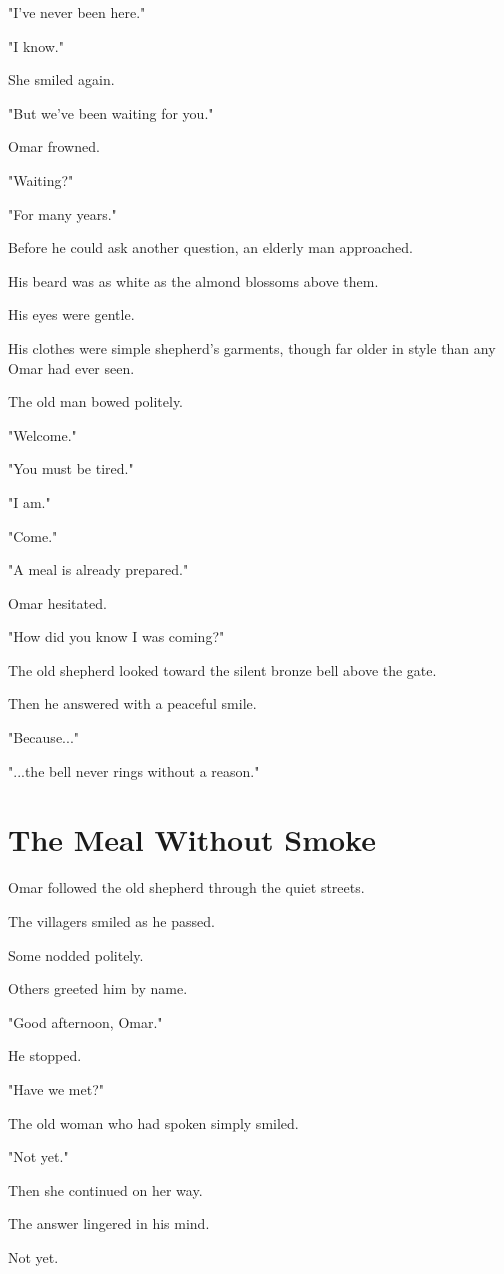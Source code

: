 \documentclass[12pt,openany]{book}
\begin{document}
"I've never been here."

"I know."

She smiled again.

"But we've been waiting for you."

Omar frowned.

"Waiting?"

"For many years."

Before he could ask another question, an elderly man approached.

His beard was as white as the almond blossoms above them.

His eyes were gentle.

His clothes were simple shepherd's garments, though far older in style than any Omar had ever seen.

The old man bowed politely.

"Welcome."

"You must be tired."

"I am."

"Come."

"A meal is already prepared."

Omar hesitated.

"How did you know I was coming?"

The old shepherd looked toward the silent bronze bell above the gate.

Then he answered with a peaceful smile.

"Because..."

"...the bell never rings without a reason."
\section*{The Meal Without Smoke}

Omar followed the old shepherd through the quiet streets.

The villagers smiled as he passed.

Some nodded politely.

Others greeted him by name.

"Good afternoon, Omar."

He stopped.

"Have we met?"

The old woman who had spoken simply smiled.

"Not yet."

Then she continued on her way.

The answer lingered in his mind.

Not yet.
\end{document}
